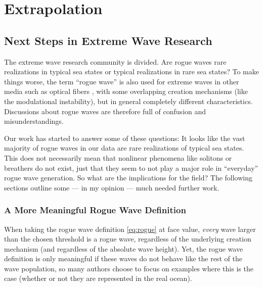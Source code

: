 \chapter{Extrapolation} \label{chap:outro}

\section{Next Steps in Extreme Wave Research}

%
The extreme wave research community is divided. Are rogue waves rare realizations in typical sea states or typical realizations in rare sea states? To make things worse, the term \enquote{rogue wave} is also used for extreme waves in other media such as optical fibers \citep[see \eg][]{dudley_rogue_2019}, with some overlapping creation mechanisms (like the modulational instability), but in general completely different characteristics. Discussions about rogue waves are therefore full of confusion and misunderstandings.

Our work has started to answer some of these questions: It looks like the vast majority of rogue waves in our data are rare realizations of typical sea states. This does not necessarily mean that nonlinear phenomena like solitons or breathers do not exist, just that they seem to not play a major role in \enquote{everyday} rogue wave generation. So what are the implications for the field? The following sections outline some --- in my opinion --- much needed further work.

\subsection{A More Meaningful Rogue Wave Definition}

When taking the rogue wave definition \eqref{eq:rogue} at face value, \emph{every} wave larger than the chosen threshold is a rogue wave, regardless of the underlying creation mechanism (and regardless of the absolute wave height). Yet, the rogue wave definition is only meaningful if these waves do not behave like the rest of the wave population, so many authors choose to focus on examples where this is the case (whether or not they are represented in the real ocean).

